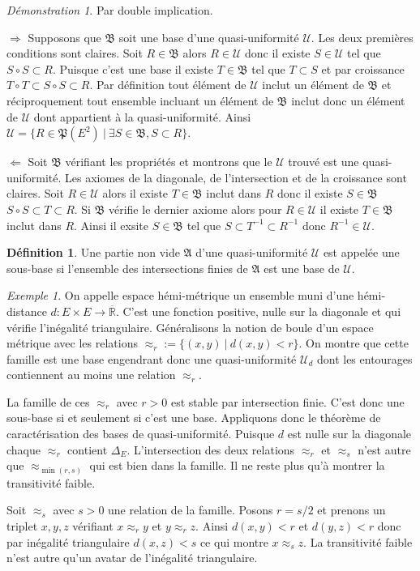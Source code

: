 \documentclass[a4paper, 11pt, french]{book}
\newenvironment{itemise}{\itemize}{\enditemize}
\theoremstyle{plain} %
\theoremstyle{definition} %
\newtheorem{definition}{Définition}
\theoremstyle{remark} %
\newtheorem{exemple}{Exemple}
\newtheorem*{demonstration}{Démonstration}
\newcommand{\1}{\mathds{1}}
\newcommand{\inv}[1]{#1^{-1}}
\newcommand{\R}{\mathbb{R}}
\renewcommand{\frak}[1]{\mathfrak{#1}}
\newcommand{\scr}[1]{\mathscr{#1}}
\newcommand\ens[2]{\{#1 \ |\ #2\}}
\newcommand\equivalence[3]{
	\begin{demonstration}
		#1
		\begin{itemise}
			\item[$\Longrightarrow$] #2
			\item[$\Longleftarrow$] #3
		\end{itemise}
	\end{demonstration}
}
\begin{document}
\equivalence{Par double implication.}{
	Supposons que $\frak{B}$ soit une base d'une quasi-uniformité $\scr{U}$.
	Les deux premières conditions sont claires.
	Soit $R\in\frak{B}$ alors $R\in\scr{U}$ donc il existe $S\in\scr{U}$ tel que $S\circ S\subset R$.
	Puisque c'est une base il existe $T\in\frak{B}$ tel que $T\subset S$ et par croissance $T\circ T\subset S\circ S\subset R$.
	Par définition tout élément de $\scr{U}$ inclut un élément de $\frak{B}$ et réciproquement tout ensemble incluant un élément de $\frak{B}$ inclut donc un élément de $\scr{U}$ dont appartient à la quasi-uniformité.
	Ainsi $\scr{U}=\ens{R\in\frak{P}(E^2)}{\exists S\in\frak{B}, S\subset R}$.
}{
	Soit $\frak{B}$ vérifiant les propriétés et montrons que le $\scr{U}$ trouvé est une quasi-uniformité.
	Les axiomes de la diagonale, de l'intersection et de la croissance sont claires.
	Soit $R\in\scr{U}$ alors il existe $T\in\frak{B}$ inclut dans $R$ donc il existe $S\in\frak{B}$ $S\circ S\subset T\subset R$.
	Si $\frak{B}$ vérifie le dernier axiome alors pour $R\in\scr{U}$ il existe $T\in\frak{B}$ inclut dans $R$.
	Ainsi il exsite $S\in\frak{B}$ tel que $S\subset\inv{T}\subset\inv{R}$ donc $\inv{R}\in\scr{U}$.
}

\begin{definition}
	Une partie non vide $\frak{A}$ d'une quasi-uniformité $\scr{U}$ est appelée une sous-base si l'ensemble des intersections finies de $\frak{A}$ est une base de $\scr{U}$.
\end{definition}

\begin{exemple}
	On appelle espace hémi-métrique un ensemble muni d'une hémi-distance $d\colon E\times E\rightarrow\overline{\R}$.
	C'est une fonction positive, nulle sur la diagonale et qui vérifie l'inégalité triangulaire.
	Généralisons la notion de boule d'un espace métrique avec les relations $\approx_r :=\ens{(x, y)}{d(x, y)<r}$.
	On montre que cette famille est une base engendrant donc une quasi-uniformité $\scr{U}_d$ dont les entourages contiennent au moins une relation $\approx_r$.

	La famille de ces $\approx_r$ avec $r>0$ est stable par intersection finie.
	C'est donc une sous-base si et seulement si c'est une base.
	Appliquons donc le théorème de caractérisation des bases de quasi-uniformité.
	Puisque $d$ est nulle sur la diagonale chaque $\approx_r$ contient $\Delta_E$.
	L'intersection des deux relations $\approx_r$ et $\approx_s$ n'est autre que $\approx_{\min(r, s)}$ qui est bien dans la famille.
	Il ne reste plus qu'à montrer la transitivité faible.

	Soit $\approx_s$ avec $s>0$ une relation de la famille.
	Posons $r=s/2$ et prenons un triplet $x, y, z$ vérifiant $x\approx_ry$ et $y\approx_rz$.
	Ainsi $d(x, y)<r$ et $d(y, z)<r$ donc par inégalité triangulaire $d(x,z)<s$ ce qui montre $x\approx_s z$.
	La transitivité faible n'est autre qu'un avatar de l'inégalité triangulaire.
\end{exemple}
\end{document}
